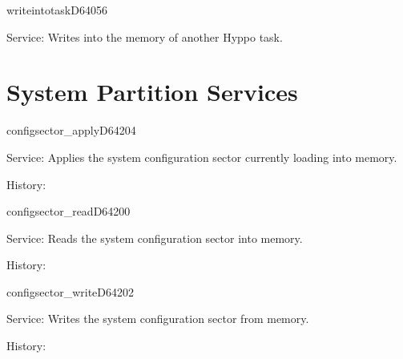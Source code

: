 \newpage
\begin{hyppotrap}{writeintotask}{D640}{56}
\item [Service:]
  Writes into the memory of another Hyppo task.
\notimplemented
\end{hyppotrap}



\newpage
\section{System Partition Services}


\begin{hyppotrap}{configsector\_apply}{D642}{04}
\item [Service:]
  Applies the system configuration sector currently loading into memory.
\item [History:]
\end{hyppotrap}


\begin{hyppotrap}{configsector\_read}{D642}{00}
\item [Service:]
  Reads the system configuration sector into memory.
\item [History:]
\end{hyppotrap}


\begin{hyppotrap}{configsector\_write}{D642}{02}
\item [Service:]
  Writes the system configuration sector from memory.
\item [History:]
\end{hyppotrap}


